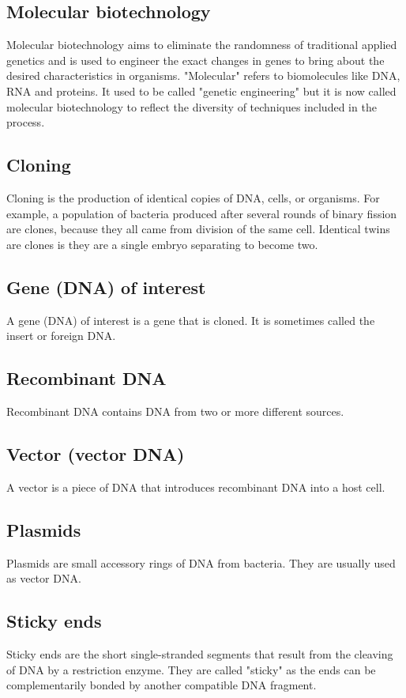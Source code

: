 \documentclass[11pt]{article}
\begin{document}
\subsection{Molecular biotechnology}
\label{sec:orgd69f61e}
Molecular biotechnology aims to eliminate the randomness of traditional applied genetics and is used to engineer the exact changes in genes to bring about the desired characteristics in organisms. "Molecular" refers to biomolecules like DNA, RNA and proteins. It used to be called "genetic engineering" but it is now called molecular biotechnology to reflect the diversity of techniques included in the process.
\subsection{Cloning}
\label{sec:org3b2eda0}
Cloning is the production of identical copies of DNA, cells, or organisms. For example, a population of bacteria produced after several rounds of binary fission are clones, because they all came from division of the same cell. Identical twins are clones is they are a single embryo separating to become two.
\subsection{Gene (DNA) of interest}
\label{sec:org5686785}
A gene (DNA) of interest is a gene that is cloned. It is sometimes called the insert or foreign DNA.
\subsection{Recombinant DNA}
\label{sec:orgab212a3}
Recombinant DNA contains DNA from two or more different sources.
\subsection{Vector (vector DNA)}
\label{sec:org0a2cad4}
A vector is a piece of DNA that introduces recombinant DNA into a host cell.
\subsection{Plasmids}
\label{sec:orgb014de0}
Plasmids are small accessory rings of DNA from bacteria. They are usually used as vector DNA.
\subsection{Sticky ends}
\label{sec:org10a6c75}
Sticky ends are the short single-stranded segments that result from the cleaving of DNA by a restriction enzyme. They are called "sticky" as the ends can be complementarily bonded by another compatible DNA fragment.
\end{document}
